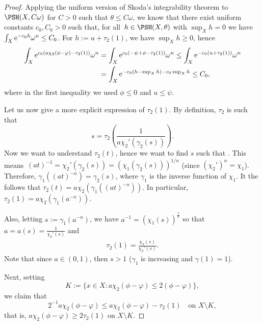 \begin{proof}
Applying the uniform version of Skoda's integrability theorem \cite{Zer01} to $\PSH(X,C\omega)$ for ${C>0}$ such that $\theta\leq C\omega$, we know that there exist uniform constants $c_0, C_0>0$ such that, for all~${h \in \PSH(X,\theta)}$ with $\sup_X h=0$ we have $\int_X {\rm e}^{-c_0 h} \omega^n \leq C_0$. For $h:=u+\tau_2(1)$, we have $\sup_X h \geq 0$, hence
\begin{align*}%
 \int_X {\rm e}^{c_0 (a \chi_2(\phi-\varphi) -\tau_2(1))} \omega^n &= \int_X {\rm e}^{c_0 (-\psi+\phi -\tau_2(1))} \omega^n \leq \int_X {\rm e}^{-c_0 (u +\tau_2(1))} \omega^n
\\&= \int_X {\rm e}^{-c_0 (h-\sup_X h) - c_0\sup_X h} \leq C_0,
\end{align*}
where in the first inequality we used $\phi\leq 0$ and $u\leq \psi$.

Let us now give a more explicit expression of $\tau_2(1)$.
By definition, $\tau_2$ is such that
\[s=\tau_2 \left( \frac{1}{a\chi_2'(\gamma_2(s))} \right).\] Now we want to understand $\tau_2(t)$, hence we want to find $s$ such that . This means~${ (at)^{-1}=\chi_2'(\gamma_2(s)) = (\chi_1(\gamma_2(s)))^{1/n} }$ (since $(\chi_2')^n=\chi_1$). Therefore, $\gamma_1((at)^{-n}) =\gamma_2(s)$, where $\gamma_1$ is the inverse function of $\chi_1$. It the follows that $ \tau_2(t)= a\chi_2(\gamma_1((at)^{-n}))$.
In particular, $\tau_2(1)= a\chi_2(\gamma_1(a^{-n}))$.

Also, letting $s:=\gamma_1 (a^{-n})$, we have $a^{-1} = (\chi_1(s))^{\frac{1}{n}}$ so that $a=a(s) = \frac{1}{\chi_2'(s)}$ and
\begin{gather} \tau_2(1) = \frac{\chi_2(s)}{\chi_2'(s)}. \label{Bo} \end{gather}
Note that since $a\in(0,1)$, then $s > 1$ ($\gamma_1$ is increasing and $\gamma(1)=1$).

Next, setting \[K:= \{ x \in X \colon a \chi_2(\phi - \varphi) \leq 2(\phi - \varphi) \},\]
we claim that
\[2^{-1} a \chi_2(\phi - \varphi) \leq a \chi_2(\phi - \varphi) - \tau_2(1) \quad \text{on $X \setminus K$},\]
that is, $a \chi_2(\phi - \varphi) \geq 2 \tau_2(1)$ on $X \setminus K$.


\end{proof}
